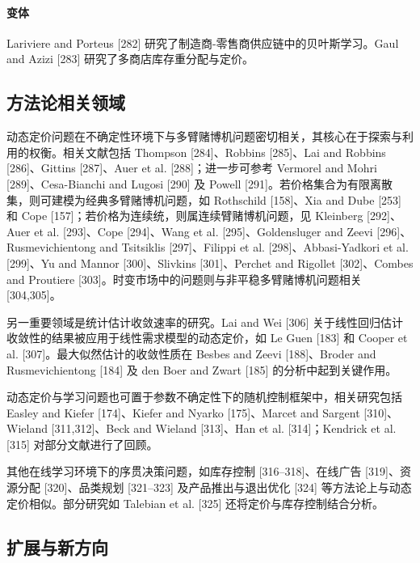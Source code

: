 \paragraph{变体}\label{variants}

Lariviere and Porteus {[}282{]} 研究了制造商-零售商供应链中的贝叶斯学习。Gaul and Azizi {[}283{]} 研究了多商店库存重分配与定价。



\subsection{方法论相关领域}\label{methodologically-related-areas}

动态定价问题在不确定性环境下与多臂赌博机问题密切相关，其核心在于探索与利用的权衡。相关文献包括 Thompson [284]、Robbins [285]、Lai and Robbins [286]、Gittins [287]、Auer et al. [288]；进一步可参考 Vermorel and Mohri [289]、Cesa-Bianchi and Lugosi [290] 及 Powell [291]。若价格集合为有限离散集，则可建模为经典多臂赌博机问题，如 Rothschild [158]、Xia and Dube [253] 和 Cope [157]；若价格为连续统，则属连续臂赌博机问题，见 Kleinberg [292]、Auer et al. [293]、Cope [294]、Wang et al. [295]、Goldensluger and Zeevi [296]、Rusmevichientong and Tsitsiklis [297]、Filippi et al. [298]、Abbasi-Yadkori et al. [299]、Yu and Mannor [300]、Slivkins [301]、Perchet and Rigollet [302]、Combes and Proutiere [303]。时变市场中的问题则与非平稳多臂赌博机问题相关 [304,305]。

另一重要领域是统计估计收敛速率的研究。Lai and Wei [306] 关于线性回归估计收敛性的结果被应用于线性需求模型的动态定价，如 Le Guen [183] 和 Cooper et al. [307]。最大似然估计的收敛性质在 Besbes and Zeevi [188]、Broder and Rusmevichientong [184] 及 den Boer and Zwart [185] 的分析中起到关键作用。

动态定价与学习问题也可置于参数不确定性下的随机控制框架中，相关研究包括 Easley and Kiefer [174]、Kiefer and Nyarko [175]、Marcet and Sargent [310]、Wieland [311,312]、Beck and Wieland [313]、Han et al. [314]；Kendrick et al. [315] 对部分文献进行了回顾。

其他在线学习环境下的序贯决策问题，如库存控制 [316–318]、在线广告 [319]、资源分配 [320]、品类规划 [321–323] 及产品推出与退出优化 [324] 等方法论上与动态定价相似。部分研究如 Talebian et al. [325] 还将定价与库存控制结合分析。

\subsection{扩展与新方向}\label{extensions-and-new-directions}


